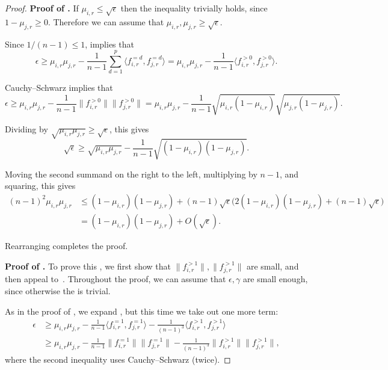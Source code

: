 \documentclass{article}
\theoremstyle{definition}
\theoremstyle{remark}
\begin{document}
\begin{proof}
\smallskip
\textbf{Proof of .}
If $\mu_{i,r} \leq \sqrt{\epsilon}$ then the inequality trivially holds, since $1 - \mu_{j,r} \geq 0$. Therefore we can assume that $\mu_{i,r},\mu_{j,r} \ge \sqrt{\epsilon}$.

Since $1/(n-1) \leq 1$,  implies that
\[
 \epsilon \ge \mu_{i,r} \mu_{j,r} - \frac{1}{n-1} \sum_{d=1}^p \langle f_{i,r}^{=d}, f_{j,r}^{=d}\rangle = \mu_{i,r} \mu_{j,r} - \frac{1}{n-1} \langle f_{i,r}^{>0}, f_{j,r}^{>0} \rangle.
\]

Cauchy--Schwarz implies that
\[
 \epsilon \ge \mu_{i,r} \mu_{j,r} - \frac{1}{n-1} \|f_{i,r}^{>0}\| \|f_{j,r}^{>0}\| = 
 \mu_{i,r} \mu_{j,r} - \frac{1}{n-1} \sqrt{\mu_{i,r} (1 - \mu_{i,r})} \sqrt{\mu_{j,r} (1 - \mu_{j,r})}.
\]

Dividing by $\sqrt{\mu_{i,r} \mu_{j,r}} \ge \sqrt{\epsilon}$, this gives
\[
 \sqrt{\epsilon} \ge \sqrt{\mu_{i,r} \mu_{j,r}} - \frac{1}{n-1} \sqrt{(1 - \mu_{i,r}) (1-\mu_{j,r})}.
\]

Moving the second summand on the right to the left, multiplying by $n-1$, and squaring, this gives
\begin{align*}
 (n-1)^2 \mu_{i,r} \mu_{j,r} &\leq (1-\mu_{i,r})(1-\mu_{j,r}) + (n-1) \sqrt{\epsilon} \bigl(2(1-\mu_{i,r})(1-\mu_{j,r}) + (n-1)\sqrt{\epsilon}\bigr) \\ &=
 (1-\mu_{i,r})(1-\mu_{j,r}) + O(\sqrt{\epsilon}).
\end{align*}

Rearranging completes the proof.

\smallskip
\textbf{Proof of .}
To prove this , we first show that $\|f_{i,r}^{>1}\|, \|f_{j,r}^{>1}\|$ are small, and then appeal to~\cite[Lemma 2.4]{ADFS}.
Throughout the proof, we can assume that $\epsilon,\gamma$ are small enough, since otherwise the  is trivial.

As in the proof of , we expand , but this time we take out one more term:
\begin{align*}
 \epsilon &\ge \mu_{i,r} \mu_{j,r} - \frac{1}{n-1} \langle f_{i,r}^{=1}, f_{j,r}^{=1} \rangle - \frac{1}{(n-1)^3} \langle f_{i,r}^{>1}, f_{j,r}^{>1} \rangle \\ &\ge
 \mu_{i,r} \mu_{j,r} - \frac{1}{n-1} \|f_{i,r}^{=1} \| \|f_{j,r}^{=1}\| - \frac{1}{(n-1)^3} \|f_{i,r}^{>1}\| \|f_{j,r}^{>1}\|,
\end{align*}
where the second inequality uses Cauchy--Schwarz (twice).


\end{proof}
\end{document}
